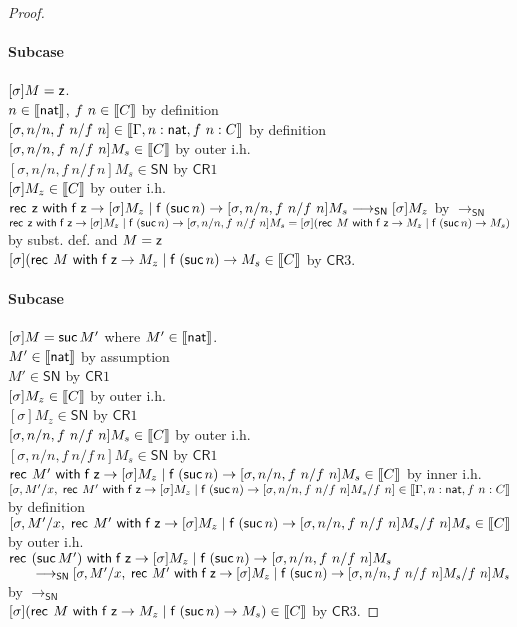 \documentclass{article}
\newcommand{\SN}{\mathsf{SN}}
\newcommand{\CR}{\textsf{CR}}
\newcommand{\redSN}{\longrightarrow_\SN}
\def\lv{\mathopen{{[\kern-0.14em[}}}    %
\def\rv{\mathclose{{]\kern-0.14em]}}}   %
\newcommand{\den}[1]{\lv #1 \rv}
\begin{document}
\begin{proof}
 \paragraph{Subcase } $[\sigma]M = \mathsf{z}$.
 \\
 $n \in \den{\nat}$, $f~n \in \den{C}$ \hfill by definition \\
 $[\sigma, n/n, f~n/f~n] \in \den{\Gamma, n:\nat, f~n:C}$ \hfill by definition \\
 $[\sigma, n/n, f~n/f~n]M_s \in \den{C}$ \hfill by outer i.h. \\
 $[\sigma, n/n, f~n/f~n]M_s \in \SN$ \hfill by $\CR1$ \\
 $[\sigma]M_z \in \den{C}$ \hfill by outer i.h. \\
 $\recnat \zero {[\sigma]M_z} {[\sigma, n/n,f~n/f~n]M_s} \redSN [\sigma]M_z$
 \hfill by $\redSN$ \\ 
$\mathsf{rec}^{}~\mathsf{z}~\mathsf{with}\;{\mathsf{f}}\;\mathsf{z} \rightarrow [\sigma]M_z \mid {\mathsf{f}}\;({\mathsf{suc}}\, n) \rightarrow {[\sigma, n/n,f~n/f~n]M_s} = [\sigma](\mathsf{rec}^{}~M~\mathsf{with}\;{\mathsf{f}}\;\mathsf{z} \rightarrow M_z \mid {\mathsf{f}}\;({\mathsf{suc}}\, n) \rightarrow {M_s})$ \hfill by subst. def. and $M = \mathsf{z}$\\
 $[\sigma](\recnat{M} {M_z}{M_s} \in \den{C}$ \hfill by $\CR3$.

 \paragraph{Subcase } $[\sigma]M = {\mathsf{suc}}\, M'$ where $M' \in \den{\nat}$.
 \\
 $M' \in \den{\nat}$ \hfill by assumption \\
 $M' \in \SN$ \hfill by $\CR1$ \\
 $[\sigma]M_z \in \den{C}$ \hfill by outer i.h. \\
 $[\sigma]M_z \in \SN$ \hfill by $\CR1$ \\
 $[\sigma, n/n, f~n/f~n]M_s \in \den{C}$ \hfill by outer i.h. \\
$[\sigma, n/n, f~n/f~n]M_s \in \SN$ \hfill by $\CR1$ \\
 $\recnat{M'}{[\sigma]M_z}{[\sigma, n/n, f~n/f~n]M_s} \in \den{C}$ \hfill by inner i.h. \\
 $[\sigma, M'/x, \;\recnat{M'}{[\sigma]M_z}{[\sigma, n/n, f~n/f~n]M_s}/f~n] \in
 \den{\Gamma, n:\nat, f~n:C}$ \hfill by definition \\
 $[\sigma, M'/x, \;\recnat{M'}{[\sigma]M_z}{[\sigma, n/n, f~n/f~n]M_s}/f~n]M_s \in \den{C}$ \hfill by outer i.h. \\
 $\mathsf{rec}^{}~({\mathsf{suc}}\, M')~\mathsf{with}\;{\mathsf{f}}\;\mathsf{z} \rightarrow [\sigma]M_z \mid {\mathsf{f}}\;({\mathsf{suc}}\, n) \rightarrow {[\sigma, n/n, f~n/f~n]M_s} $ \\
 $\qquad \redSN
 [\sigma, M'/x, \;\recnat{M'}{[\sigma]M_z}{[\sigma, n/n, f~n/f~n]M_s}/f~n]M_s$
 \hfill by $\redSN$ \\
 $[\sigma](\recnat{M}{M_z}{M_s}) \in \den{C}$ \hfill by $\CR3$.


\end{proof}
\end{document}
